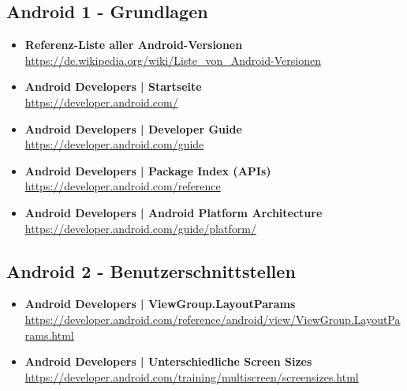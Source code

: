 \documentclass[a4paper]{article}
\begin{document}
{	\subsection{Android 1 - Grundlagen}
	
	\begin{itemize}
		\item \textbf{Referenz-Liste aller Android-Versionen}\\
		\href{https://de.wikipedia.org/wiki/Liste_von_Android-Versionen}
		{https://de.wikipedia.org/wiki/Liste\_von\_Android-Versionen}
		
		\item \textbf{Android Developers | Startseite}\\
		\href{https://developer.android.com/}
		{https://developer.android.com/}
		
		\item \textbf{Android Developers | Developer Guide}\\
		\href{https://developer.android.com/guide}
		{https://developer.android.com/guide}
		
		\item \textbf{Android Developers | Package Index (APIs)}\\
		\href{https://developer.android.com/reference
		}{https://developer.android.com/reference}
		
		\item \textbf{Android Developers | Android Platform Architecture}\\
		\href{https://developer.android.com/guide/platform/}
		{https://developer.android.com/guide/platform/}
	\end{itemize}
	
	\subsection{Android 2 - Benutzerschnittstellen}
	
	\begin{itemize}
		\item \textbf{Android Developers | ViewGroup.LayoutParams}\\
		\href{https://developer.android.com/reference/android/view/ViewGroup.LayoutParams.html}
		{https://developer.android.com/reference/android/view/ViewGroup.LayoutParams.html}
		
		\item \textbf{Android Developers | Unterschiedliche Screen Sizes}\\
		\href{https://developer.android.com/training/multiscreen/screensizes.html}
		{https://developer.android.com/training/multiscreen/screensizes.html}
		

\end{itemize}}
\end{document}
